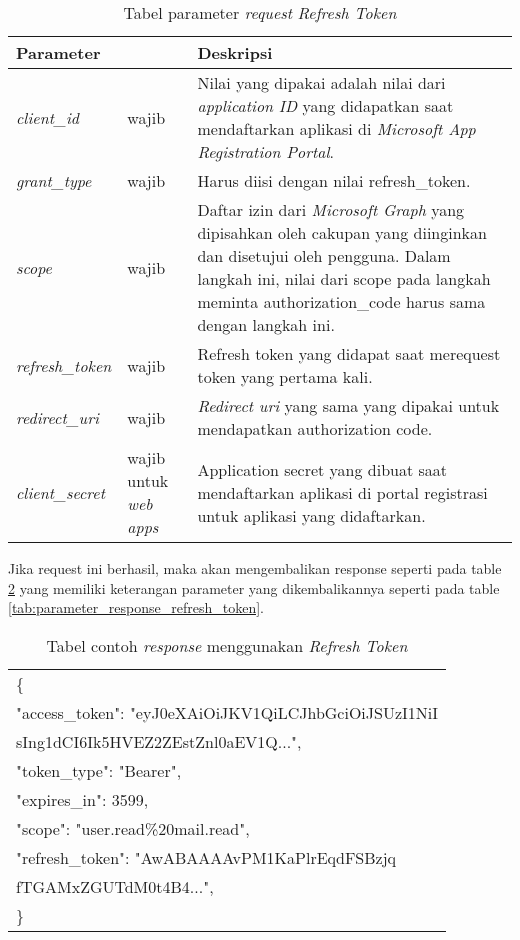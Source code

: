 \begin{table}[H]
	\centering 
	\caption{Tabel parameter \textit{request} \textit{Refresh Token}}
	\label{tab:parameter_request_refresh_token}
	\begin{tabular}{|p{3cm}|p{3cm}|p{9cm}|}
	\toprule
	 \textbf{Parameter} & & \textbf{Deskripsi}\\ \hline 
	\textit{client\_id} & wajib & Nilai yang dipakai adalah nilai dari \textit{application ID} yang didapatkan saat mendaftarkan aplikasi di \textit{Microsoft App Registration Portal}.\\ \hline 
	\textit{grant\_type} & wajib & Harus diisi dengan nilai refresh\_token. \\ \hline
	\textit{scope} & wajib & Daftar izin dari \textit{Microsoft Graph} yang dipisahkan oleh cakupan yang diinginkan dan disetujui oleh pengguna. Dalam langkah ini, nilai dari scope pada langkah meminta authorization\_code harus sama dengan langkah ini.  \\ \hline 
	\textit{refresh\_token} & wajib & Refresh token yang didapat saat merequest token yang pertama kali. \\ \hline  
	\textit{redirect\_uri} & wajib & \textit{Redirect uri} yang sama yang dipakai untuk mendapatkan authorization code. \\ \hline 
	\textit{client\_secret} & wajib untuk \textit{web apps} & Application secret yang dibuat saat mendaftarkan aplikasi di portal registrasi untuk aplikasi yang didaftarkan.\\
	\bottomrule
	\end{tabular}  
\end{table}

Jika request ini berhasil, maka akan mengembalikan response seperti pada table \ref{tab:contoh_response_refresh_token} yang memiliki keterangan parameter yang dikembalikannya seperti pada table \ref{tab:parameter_response_refresh_token}. 
\\
\begin{table}[H]
	\centering 
	\caption{Tabel contoh \textit{response} menggunakan \textit{Refresh Token}}
	\label{tab:contoh_response_refresh_token}
	\begin{tabular}{|p{12cm}|}
	\toprule
	\{\\
    "access\_token": "eyJ0eXAiOiJKV1QiLCJhbGciOiJSUzI1NiI\\
    sIng1dCI6Ik5HVEZ2ZEstZnl0aEV1Q...",\\
    "token\_type": "Bearer",\\
    "expires\_in": 3599,\\
    "scope": "user.read\%20mail.read",\\
    "refresh\_token": "AwABAAAAvPM1KaPlrEqdFSBzjq\\
    fTGAMxZGUTdM0t4B4...",\\
\}\\
	\bottomrule
	\end{tabular}  
\end{table}


